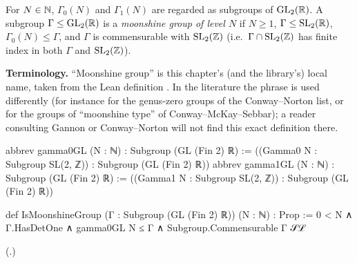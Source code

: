 \begin{definition}\label{ch16:def:moonshinegroup}
For $N\in{\mathbb{N}}$, $\Gamma_0(N)$ and $\Gamma_1(N)$ are regarded as subgroups of $\mathrm{GL}_2(\mathbb{R})$.  A subgroup
$\Gamma\le\mathrm{GL}_2(\mathbb{R})$ is a \emph{moonshine group of level $N$} if $N\ge1$, $\Gamma\le\mathrm{SL}_2(\mathbb{R})$,
$\Gamma_0(N)\le\Gamma$, and $\Gamma$ is commensurable with $\mathrm{SL}_2(\mathbb{Z})$ (i.e.\ $\Gamma\cap\mathrm{SL}_2(\mathbb{Z})$ has finite
index in both $\Gamma$ and $\mathrm{SL}_2(\mathbb{Z})$).
\end{definition}
\noindent\textbf{Terminology.}  ``Moonshine group'' is this chapter's (and the library's) local name, taken from the Lean
definition .  In the literature the phrase is used differently (for instance for the genus-zero
groups of the Conway--Norton list, or for the groups of ``moonshine type'' of Conway--McKay--Sebbar); a reader
consulting Gannon or Conway--Norton will not find this exact definition there.
\begin{leancode}
abbrev gamma0GL (N : ℕ) : Subgroup (GL (Fin 2) ℝ) := ((Gamma0 N : Subgroup SL(2, ℤ)) : Subgroup (GL (Fin 2) ℝ))
abbrev gamma1GL (N : ℕ) : Subgroup (GL (Fin 2) ℝ) := ((Gamma1 N : Subgroup SL(2, ℤ)) : Subgroup (GL (Fin 2) ℝ))

def IsMoonshineGroup (Γ : Subgroup (GL (Fin 2) ℝ)) (N : ℕ) : Prop :=
  0 < N ∧ Γ.HasDetOne ∧ gamma0GL N ≤ Γ ∧ Subgroup.Commensurable Γ 𝒮ℒ
\end{leancode}
(.)
